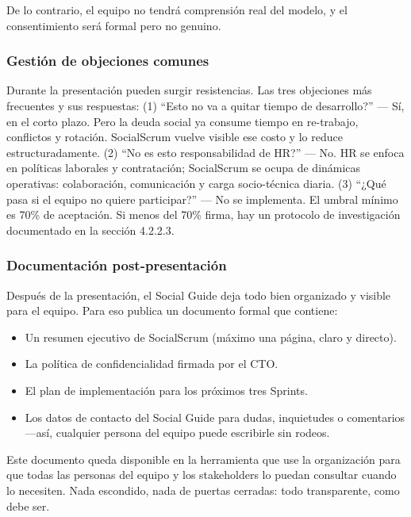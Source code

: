 De lo contrario, el equipo no tendrá comprensión real del modelo, y el consentimiento será formal pero no genuino.

\subsubsection{Gestión de objeciones comunes}

Durante la presentación pueden surgir resistencias. Las tres objeciones más frecuentes y sus respuestas: (1) ``\textquestiondown Esto no va a quitar tiempo de desarrollo?'' --- Sí, en el corto plazo. Pero la deuda social ya consume tiempo en re-trabajo, conflictos y rotación. SocialScrum vuelve visible ese costo y lo reduce estructuradamente. (2) ``\textquestiondown No es esto responsabilidad de HR?'' --- No. HR se enfoca en políticas laborales y contratación; SocialScrum se ocupa de dinámicas operativas: colaboración, comunicación y carga socio-técnica diaria. (3) ``¿Qué pasa si el equipo no quiere participar?'' --- No se implementa. El umbral mínimo es 70\% de aceptación. Si menos del 70\% firma, hay un protocolo de investigación documentado en la sección 4.2.2.3.

\subsubsection{Documentación post-presentación}

Después de la presentación, el Social Guide deja todo bien organizado y visible para el equipo. Para eso publica un documento formal que contiene:

\begin{itemize}
    \item Un resumen ejecutivo de SocialScrum (máximo una página, claro y directo).
    \item La política de confidencialidad firmada por el CTO.
    \item El plan de implementación para los próximos tres Sprints.
    \item Los datos de contacto del Social Guide para dudas, inquietudes o comentarios —así, cualquier persona del equipo puede escribirle sin rodeos.
\end{itemize}

Este documento queda disponible en  la herramienta que use la organización para que todas las personas del equipo y los stakeholders lo puedan consultar cuando lo necesiten. Nada escondido, nada de puertas cerradas: todo transparente, como debe ser.

